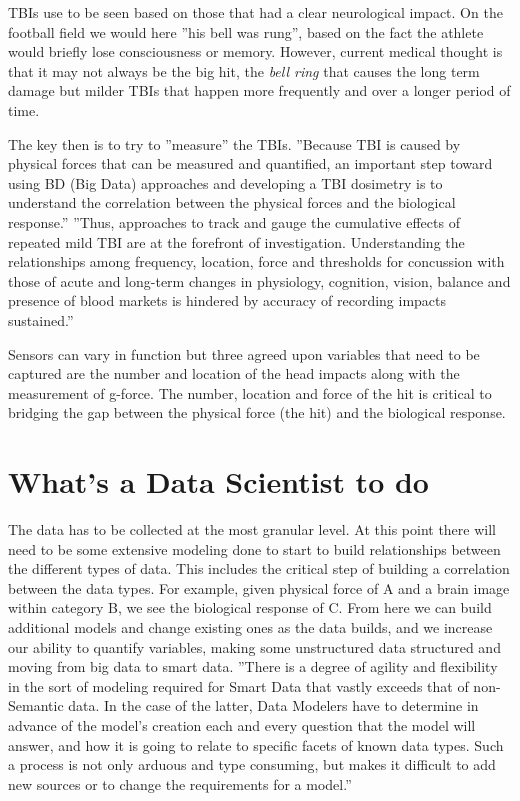 \documentclass[sigconf]{acmart}
\begin{document}
TBIs use to be seen based on those that had a clear neurological impact.  On the football field we would here ''his bell was rung'', based on the fact the athlete would briefly lose consciousness or memory.  However, current medical thought is that it may not always be the big hit, the {\em bell ring} that causes the long term damage but milder TBIs that happen more frequently and over a longer period of time.  

The key then is to try to ''measure'' the TBIs.  ''Because TBI is caused by physical forces that can be measured and quantified, an important step toward using BD (Big Data) approaches and developing a TBI dosimetry is to understand the correlation between the physical forces and the biological response.''\cite{www-futuremedicine-com}  ''Thus, approaches to track and gauge the cumulative effects of repeated mild TBI are at the forefront of investigation.  Understanding the relationships among frequency, location, force and thresholds for concussion with those of acute and long-term changes in physiology, cognition, vision, balance and presence of blood markets is hindered by accuracy of recording impacts sustained.''\cite{www-futuremedicine-com}

Sensors can vary in function but three agreed upon variables that need to be captured are the number and location of the head impacts along with the measurement of g-force.  The number, location and force of the hit is critical to bridging the gap between the physical force (the hit) and the biological response. 

\section{What's a Data Scientist to do}

The data has to be collected at the most granular level.  At this point there will need to be some extensive modeling done to start to build relationships between the different types of data.  This includes the critical step of building a correlation between the data types.  For example, given physical force of A and a brain image within category B, we see the biological response of C.  From here we can build additional models and change existing ones as the data builds, and we increase our ability to quantify variables, making some unstructured data structured and moving from big data to smart data. ''There is a degree of agility and flexibility in the sort of modeling required for Smart Data that vastly exceeds that of non-Semantic data.  In the case of the latter, Data Modelers have to determine in advance of the model's creation each and every question that the model will answer, and how it is going to relate to specific facets of known data types. Such a process is not only arduous and type consuming, but makes it difficult to add new sources or to change the requirements for a model.''\cite{www-dataversity-net}
\end{document}
